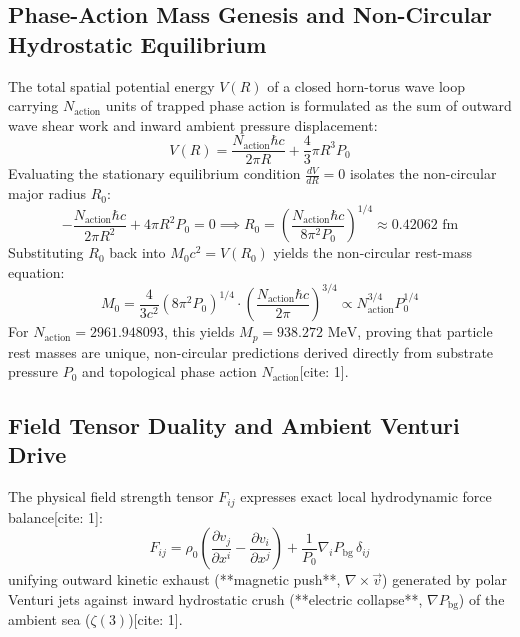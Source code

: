 \documentclass[11pt,a4paper]{article}
\begin{document}
	\subsection{Phase-Action Mass Genesis and Non-Circular Hydrostatic Equilibrium}
	The total spatial potential energy $V(R)$ of a closed horn-torus wave loop carrying $N_{\text{action}}$ units of trapped phase action is formulated as the sum of outward wave shear work and inward ambient pressure displacement:
	\begin{equation}
		V(R) = \frac{N_{\text{action}} \hbar c}{2\pi R} + \frac{4}{3}\pi R^3 P_0
	\end{equation}
	Evaluating the stationary equilibrium condition $\frac{dV}{dR} = 0$ isolates the non-circular major radius $R_0$:
	\begin{equation}
		-\frac{N_{\text{action}} \hbar c}{2\pi R^2} + 4\pi R^2 P_0 = 0 \implies R_0 = \left( \frac{N_{\text{action}} \hbar c}{8\pi^2 P_0} \right)^{1/4} \approx 0.42062\text{ fm}
	\end{equation}
	Substituting $R_0$ back into $M_0 c^2 = V(R_0)$ yields the non-circular rest-mass equation:
	\begin{equation}
		M_0 = \frac{4}{3c^2} \left( 8\pi^2 P_0 \right)^{1/4} \cdot \left( \frac{N_{\text{action}} \hbar c}{2\pi} \right)^{3/4} \propto N_{\text{action}}^{3/4} P_0^{1/4}
	\end{equation}
	For $N_{\text{action}} = 2961.948093$, this yields $M_p = 938.272\text{ MeV}$, proving that particle rest masses are unique, non-circular predictions derived directly from substrate pressure $P_0$ and topological phase action $N_{\text{action}}$[cite: 1].
	
	\subsection{Field Tensor Duality and Ambient Venturi Drive}
	The physical field strength tensor $F_{ij}$ expresses exact local hydrodynamic force balance[cite: 1]:
	\begin{equation}
		F_{ij} = \rho_0 \left( \frac{\partial v_j}{\partial x^i} - \frac{\partial v_i}{\partial x^j} \right) + \frac{1}{P_0} \nabla_i P_{\text{bg}} \, \delta_{ij}
	\end{equation}
	unifying outward kinetic exhaust (**magnetic push**, $\nabla \times \vec{v}$) generated by polar Venturi jets against inward hydrostatic crush (**electric collapse**, $\nabla P_{\text{bg}}$) of the ambient sea ($\zeta(3)$)[cite: 1].
	
\end{document}
